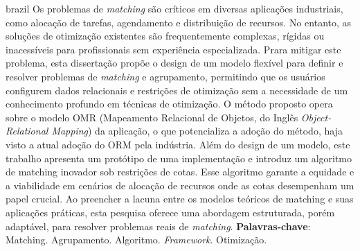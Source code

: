 
\setlength{\absparsep}{18pt} %
\begin{resumo}[RESUMO]
    \begin{otherlanguage*}{brazil}
        Os problemas de \textit{matching} são críticos em diversas aplicações industriais, como alocação de tarefas, agendamento e distribuição de recursos.
        No entanto, as soluções de otimização existentes são frequentemente complexas, rígidas ou inacessíveis para profissionais sem experiência especializada.
        Prara mitigar este problema, esta dissertação propõe o design de um modelo flexível para definir e resolver problemas de \textit{matching} e agrupamento, permitindo que os usuários configurem dados relacionais e restrições de otimização sem a necessidade de um conhecimento profundo em técnicas de otimização.
        O método proposto opera sobre o modelo OMR (Mapeamento Relacional de Objetos, do Inglês \textit{Object-Relational Mapping}) da aplicação, o que potencializa a adoção do método, haja visto a atual adoção do ORM pela indústria.
        Além do design de um modelo, este trabalho apresenta um protótipo de uma implementação e introduz um algoritmo de matching inovador sob restrições de cotas.
        Esse algoritmo garante a equidade e a viabilidade em cenários de alocação de recursos onde as cotas desempenham um papel crucial. Ao preencher a lacuna entre os modelos teóricos de matching e suas aplicações práticas, esta pesquisa oferece uma abordagem estruturada, porém adaptável, para resolver problemas reais de \textit{matching}.
    \textbf{Palavras-chave}: Matching. Agrupamento. Algoritmo. \textit{Framework}. Otimização.
    \end{otherlanguage*}
\end{resumo}
